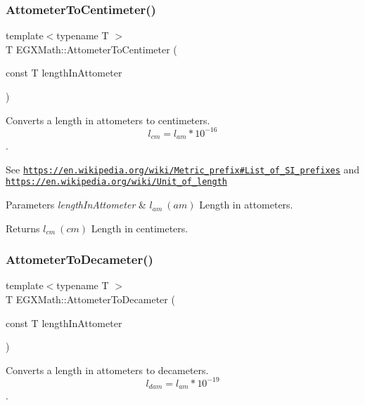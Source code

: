 \subsubsection{\texorpdfstring{Attometer\+To\+Centimeter()}{AttometerToCentimeter()}}
{\footnotesize\ttfamily template$<$typename T $>$ \\
T E\+G\+X\+Math\+::\+Attometer\+To\+Centimeter (\begin{DoxyParamCaption}\item[{const T}]{length\+In\+Attometer }\end{DoxyParamCaption})}



Converts a length in attometers to centimeters. \[ l_{cm}=l_{am} * 10^{-16} \]. 

See \href{https://en.wikipedia.org/wiki/Metric_prefix#List_of_SI_prefixes}{\tt https\+://en.\+wikipedia.\+org/wiki/\+Metric\+\_\+prefix\#\+List\+\_\+of\+\_\+\+S\+I\+\_\+prefixes} and \href{https://en.wikipedia.org/wiki/Unit_of_length}{\tt https\+://en.\+wikipedia.\+org/wiki/\+Unit\+\_\+of\+\_\+length} 
\begin{DoxyParams}{Parameters}
{\em length\+In\+Attometer} & $ l_{am}\ (am)$ Length in attometers. \\
\hline
\end{DoxyParams}
\begin{DoxyReturn}{Returns}
$ l_{cm}\ (cm)$ Length in centimeters. 
\end{DoxyReturn}
\mbox{\label{group___e_g_x_math-_conversions-_length_conversions-_s_i-_attometer-_s_i_gadfda74b37224249b3fb2644fb9611d95}} 
\subsubsection{\texorpdfstring{Attometer\+To\+Decameter()}{AttometerToDecameter()}}
{\footnotesize\ttfamily template$<$typename T $>$ \\
T E\+G\+X\+Math\+::\+Attometer\+To\+Decameter (\begin{DoxyParamCaption}\item[{const T}]{length\+In\+Attometer }\end{DoxyParamCaption})}



Converts a length in attometers to decameters. \[ l_{dam}=l_{am} * 10^{-19} \]. 

